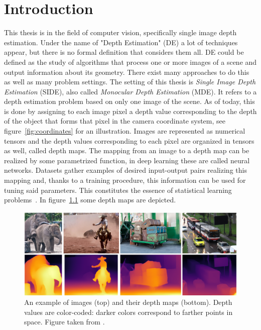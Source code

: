 \chapter{Introduction}
\label{ch:intro}

This thesis is in the field of computer vision, specifically single image depth estimation.
Under the name of "Depth Estimation" (DE) a lot of techniques appear, but there is no formal definition that considers them all.
DE could be defined as the study of algorithms that process one or more images of a scene and output information about its geometry.
There exist many approaches to do this as well as many problem settings.
The setting of this thesis is \textit{Single Image Depth Estimation} (SIDE), also called \textit{Monocular Depth Estimation} (MDE).
It refers to a depth estimation problem based on only one image of the scene.
As of today, this is done by assigning to each image pixel a depth value corresponding to the depth of the object that forms that pixel in the camera coordinate system, see figure~\ref{fig:coordinates} for an illustration.
Images are represented as numerical tensors and the depth values corresponding to each pixel are organized in tensors as well, called depth maps.
The mapping from an image to a depth map can be realized by some parametrized function, in deep learning these are called neural networks.
Datasets gather examples of desired input-output pairs realizing this mapping and, thanks to a training procedure, this information can be used for tuning said parameters.
This constitutes the essence of statistical learning problems~\cite{ML_book}.
In figure~\ref{fig:depth_maps_example} some depth maps are depicted.
\begin{figure}
    \centering
    \includegraphics[scale=0.3]{figs/depth_maps_example}
    \caption{
        An example of images (top) and their depth maps (bottom).
        Depth values are color-coded: darker colors correspond to farther points in space.
        Figure taken from \cite{MiDas}.
        \label{fig:depth_maps_example}
    }
\end{figure}
